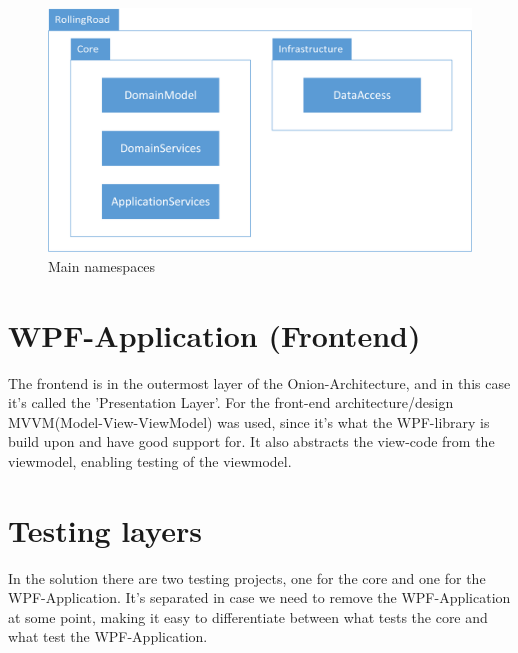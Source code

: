 \begin{figure}
	\centering
	\includegraphics[width=0.7\linewidth]{Images/Namespaces}
	\caption{Main namespaces}
	\label{fig:Namespaces}
\end{figure}

\section{WPF-Application (Frontend)}

The frontend is in the outermost layer of the Onion-Architecture, and in this case it's called the 'Presentation Layer'. For the front-end architecture/design MVVM(Model-View-ViewModel) was used, since it's what the WPF-library is build upon and have good support for. It also abstracts the view-code from the viewmodel, enabling testing of the viewmodel.

\section{Testing layers}

In the solution there are two testing projects, one for the core and one for the WPF-Application. It's separated in case we need to remove the WPF-Application at some point, making it easy to differentiate between what tests the core and what test the WPF-Application.